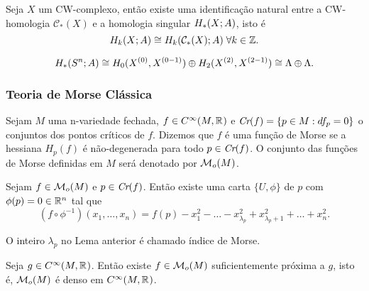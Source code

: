 \documentclass{beamer}
\begin{document}
	\begin{frame}
		\begin{teorema}[CW-homologia]
			Seja $X$ um CW-complexo, então existe uma identificação natural entre a CW-homologia $\mathcal{C}_{*}(X)$ e a homologia singular $H_{*}(X;A)$, isto é 
			$$
			H_{k}(X;A) \cong H_{k}(\mathcal{C}_{*}(X);A)\; \forall k \in \mathbb{Z}.
			$$
		\end{teorema}
		\begin{exemplo}[2-esfera]
			$$
			H_{*}(S^{n};A) \cong H_{0}(X^{(0)}, X^{(0-1)}) \oplus H_{2}(X^{(2)}, X^{(2-1)})\cong \Lambda\oplus\Lambda.
			$$
		\end{exemplo}
		
	\end{frame}

	\begin{frame}
		\frametitle{Teoria de Morse Clássica}
		\begin{definicao}
			Sejam $M$ uma n-variedade fechada, $f \in C^{\infty}(M, \mathbb{R}^{})$ e $\textit{Cr}(f) = \{p \in M: df_{p} = 0\}$ o conjuntos dos pontos críticos de $f$. Dizemos que $f$ é uma função de Morse se a hessiana $H_{p}(f)$ é não-degenerada para todo $p \in \textit{Cr}(f)$. O conjunto das funções de Morse definidas em $M$ será denotado por $\mathcal{M}_{o}(M)$. 
		\end{definicao}
		\begin{lema}
			Sejam $f \in \mathcal{M}_{o}(M)$ e $p \in \textit{Cr}(f)$. Então existe uma carta $\{U, \phi\}$ de $p$ com $\phi(p)=0 \in \mathbb{R}^{n}$ tal que 
			$$
			(f\circ \phi^{-1})(x_{1}, \dots, x_{n}) = f(p)-x_{1}^{2}-\dots -x^{2}_{\lambda_{p}}+x^{2}_{\lambda_{p}+1}+\dots + x^{2}_{n}.
			$$
		\end{lema}
	\end{frame}
	
	\begin{frame}
		
		\begin{definicao}
			O inteiro $\lambda_{p}$ no Lema anterior é chamado índice de Morse.
		\end{definicao}
		
		\pause
		\begin{teorema}
			Seja $g\in C^{\infty}(M, \mathbb{R}^{})$. Então existe $f \in \mathcal{M}_{o}(M)$ suficientemente próxima a $g$, isto é, $\mathcal{M}_{o}(M)$ é denso em $C^{\infty}(M, \mathbb{R}^{})$.
		\end{teorema}
	\end{frame}
	
\end{document}
